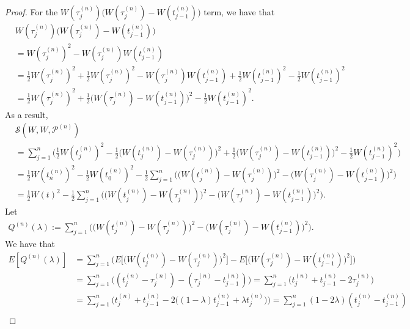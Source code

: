 \documentclass[10pt]{article}
\newcommand{\mcal}[1]{\mathcal{#1}}
\begin{document}
\begin{itemize}
\begin{proof}
    For the $W(\tau_j^{(n)}) \Big( W(\tau_j^{(n)}) - W(t_{j-1}^{(n)})\Big)$ term, we have that
    \begin{align*}
      &W(\tau_j^{(n)}) \Big( W(\tau_j^{(n)}) - W(t_{j-1}^{(n)})\Big) \\
      &= W(\tau_j^{(n)})^2 - W(\tau_j^{(n)})W(t_{j-1}^{(n)}) \\
      &= \frac{1}{2} W(\tau_j^{(n)})^2 + \frac{1}{2} W(\tau_j^{(n)})^2 - W(\tau_j^{(n)})W(t_{j-1}^{(n)}) + \frac{1}{2} W(t_{j-1}^{(n)})^2 - \frac{1}{2} W(t_{j-1}^{(n)})^2 \\
      &= \frac{1}{2} W(\tau_j^{(n)})^2 
      + \frac{1}{2}\Big( W(\tau^{(n)}_j) - W(t^{(n)}_{j-1} )\Big)^2 
      - \frac{1}{2} W(t_{j-1}^{(n)})^2.
    \end{align*}
    As a result,
    \begin{align*}
      &\mcal{S}(W,W,\mcal{P}^{(n)}) \\
      &= \sum_{j=1}^n \bigg( \frac{1}{2}W(t^{(n)}_j)^2 - \frac{1}{2}\Big( W(t^{(n)}_j) - W(\tau^{(n)}_j )\Big)^2 + \frac{1}{2}\Big( W(\tau^{(n)}_j) - W(t^{(n)}_{j-1} )\Big)^2 - \frac{1}{2}W(t^{(n)}_{j-1})^2 \bigg)\\
      &= \frac{1}{2}W(t_n^{(n)})^2 - \frac{1}{2}W(t_0^{(n)})^2 - \frac{1}{2} \sum_{j=1}^n \bigg( \Big( W(t^{(n)}_j) - W(\tau^{(n)}_j )\Big)^2 - \Big( W(\tau^{(n)}_j) - W(t^{(n)}_{j-1} )\Big)^2  \bigg) \\
      &= \frac{1}{2} W(t)^2 - \frac{1}{2} \sum_{j=1}^n \bigg( \Big( W(t^{(n)}_j) - W(\tau^{(n)}_j )\Big)^2 - \Big( W(\tau^{(n)}_j) - W(t^{(n)}_{j-1} )\Big)^2  \bigg).
    \end{align*}
    Let
    \begin{align*}
      Q^{(n)}(\lambda) := \sum_{j=1}^n \bigg( \Big( W(t^{(n)}_j) - W(\tau^{(n)}_j )\Big)^2 - \Big( W(\tau^{(n)}_j) - W(t^{(n)}_{j-1} )\Big)^2  \bigg).
    \end{align*}
    We have that
    \begin{align*}
      E[Q^{(n)}(\lambda)]
      &= \sum_{j=1}^n \bigg( E\Big[ \Big( W(t^{(n)}_j) - W(\tau^{(n)}_j )\Big)^2 \Big] - E\Big[ \Big( W(\tau^{(n)}_j) - W(t^{(n)}_{j-1} )\Big)^2 \Big]  \bigg) \\
      &= \sum_{j=1}^n \bigg( (t_j^{(n)} - \tau_j^{(n)}) - (\tau_j^{(n)} - t^{(n)}_{j-1}) \bigg) 
      = \sum_{j=1}^n \Big( t_j^{(n)} + t_{j-1}^{(n)} - 2\tau_j^{(n)} \Big) \\
      &= \sum_{j=1}^n \Big( t_j^{(n)} + t_{j-1}^{(n)} - 2\big( (1-\lambda)t_{j-1}^{(n)} + \lambda t_{j}^{(n)} \big) \Big)
      = \sum_{j=1}^n (1 - 2\lambda)(t_j^{(n)} - t_{j-1}^{(n)}) \\

\end{align*}
\end{proof}
\end{itemize}
\end{document}
